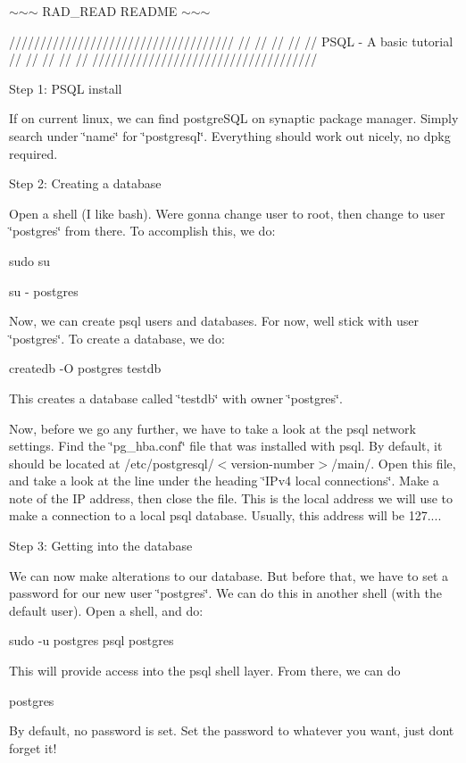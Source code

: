 $\sim$$\sim$$\sim$ R\+A\+D\+\_\+\+R\+E\+AD R\+E\+A\+D\+ME $\sim$$\sim$$\sim$

//////////////////////////////////// // // // // // P\+S\+QL -\/ A basic tutorial // // // // // ////////////////////////////////////

Step 1\+: P\+S\+QL install

If on current linux, we can find postgre\+S\+QL on synaptic package manager. Simply search under \char`\"{}name\char`\"{} for \char`\"{}postgresql\char`\"{}. Everything should work out nicely, no dpkg required.

Step 2\+: Creating a database

Open a shell (I like bash). We\textquotesingle{}re gonna change user to root, then change to user \char`\"{}postgres\char`\"{} from there. To accomplish this, we do\+:

sudo su

su -\/ postgres

Now, we can create psql users and databases. For now, we\textquotesingle{}ll stick with user \char`\"{}postgres\char`\"{}. To create a database, we do\+:

createdb -\/O postgres testdb

This creates a database called \char`\"{}testdb\char`\"{} with owner \char`\"{}postgres\char`\"{}.

Now, before we go any further, we have to take a look at the psql network settings. Find the \char`\"{}pg\+\_\+hba.\+conf\char`\"{} file that was installed with psql. By default, it should be located at /etc/postgresql/$<$version-\/number$>$/main/. Open this file, and take a look at the line under the heading \char`\"{}\+I\+Pv4 local
  connections\char`\"{}. Make a note of the IP address, then close the file. This is the local address we will use to make a connection to a local psql database. Usually, this address will be 127....

Step 3\+: Getting into the database

We can now make alterations to our database. But before that, we have to set a password for our new user \char`\"{}postgres\char`\"{}. We can do this in another shell (with the default user). Open a shell, and do\+:

sudo -\/u postgres psql postgres

This will provide access into the psql shell layer. From there, we can do

postgres

By default, no password is set. Set the password to whatever you want, just don\textquotesingle{}t forget it!

